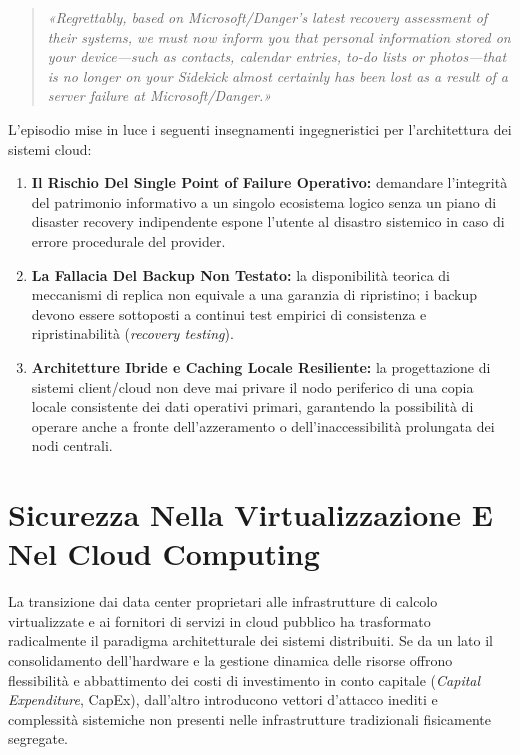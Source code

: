\documentclass[11pt, a4paper]{article}
\begin{document}
\begin{quote}
\emph{«Regrettably, based on Microsoft/Danger's latest recovery assessment of their systems, we must now inform you that personal information stored on your device—such as contacts, calendar entries, to-do lists or photos—that is no longer on your Sidekick almost certainly has been lost as a result of a server failure at Microsoft/Danger.»}
\end{quote}

L'episodio mise in luce i seguenti insegnamenti ingegneristici per l'architettura dei sistemi cloud:
\begin{enumerate}
    \item \textbf{Il Rischio Del Single Point of Failure Operativo:} demandare l'integrità del patrimonio informativo a un singolo ecosistema logico senza un piano di disaster recovery indipendente espone l'utente al disastro sistemico in caso di errore procedurale del provider.
    \item \textbf{La Fallacia Del Backup Non Testato:} la disponibilità teorica di meccanismi di replica non equivale a una garanzia di ripristino; i backup devono essere sottoposti a continui test empirici di consistenza e ripristinabilità (\emph{recovery testing}).
    \item \textbf{Architetture Ibride e Caching Locale Resiliente:} la progettazione di sistemi client/cloud non deve mai privare il nodo periferico di una copia locale consistente dei dati operativi primari, garantendo la possibilità di operare anche a fronte dell'azzeramento o dell'inaccessibilità prolungata dei nodi centrali.
\end{enumerate}


\section{Sicurezza Nella Virtualizzazione E Nel Cloud Computing}

La transizione dai data center proprietari alle infrastrutture di calcolo virtualizzate e ai fornitori di servizi in cloud pubblico ha trasformato radicalmente il paradigma architetturale dei sistemi distribuiti. Se da un lato il consolidamento dell'hardware e la gestione dinamica delle risorse offrono flessibilità e abbattimento dei costi di investimento in conto capitale (\emph{Capital Expenditure}, CapEx), dall'altro introducono vettori d'attacco inediti e complessità sistemiche non presenti nelle infrastrutture tradizionali fisicamente segregate.
\end{document}
